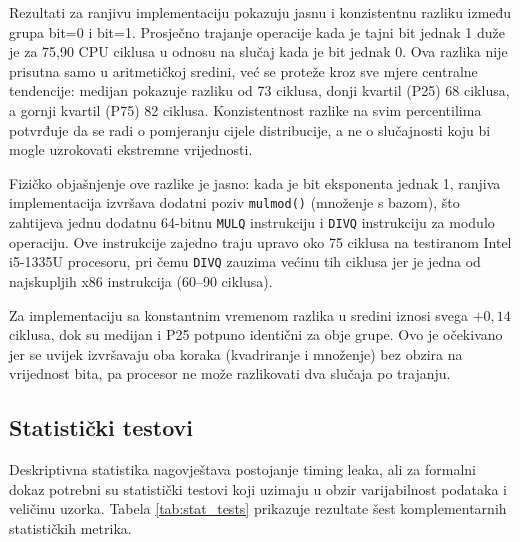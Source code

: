 Rezultati za ranjivu implementaciju pokazuju jasnu i konzistentnu razliku između grupa bit=0 i bit=1. Prosječno trajanje operacije kada je tajni bit jednak 1 duže je za 75{,}90 CPU ciklusa u odnosu na slučaj kada je bit jednak 0. Ova razlika nije prisutna samo u aritmetičkoj sredini, već se proteže kroz sve mjere centralne tendencije: medijan pokazuje razliku od 73 ciklusa, donji kvartil (P25) 68 ciklusa, a gornji kvartil (P75) 82 ciklusa. Konzistentnost razlike na svim percentilima potvrđuje da se radi o pomjeranju cijele distribucije, a ne o slučajnosti koju bi mogle uzrokovati ekstremne vrijednosti.

Fizičko objašnjenje ove razlike je jasno: kada je bit eksponenta jednak 1, ranjiva implementacija izvršava dodatni poziv \texttt{mulmod()} (množenje s bazom), što zahtijeva jednu dodatnu 64-bitnu \texttt{MULQ} instrukciju i \texttt{DIVQ} instrukciju za modulo operaciju. Ove instrukcije zajedno traju upravo oko 75 ciklusa na testiranom Intel i5-1335U procesoru, pri čemu \texttt{DIVQ} zauzima većinu tih ciklusa jer je jedna od najskupljih x86 instrukcija (60--90 ciklusa).

Za implementaciju sa konstantnim vremenom razlika u sredini iznosi svega $+0{,}14$ ciklusa, dok su medijan i P25 potpuno identični za obje grupe. Ovo je očekivano jer se uvijek izvršavaju oba koraka (kvadriranje i množenje) bez obzira na vrijednost bita, pa procesor ne može razlikovati dva slučaja po trajanju.

\subsection{Statistički testovi}
\label{sec:stat_tests}

Deskriptivna statistika nagovještava postojanje timing leaka, ali za formalni dokaz potrebni su statistički testovi koji uzimaju u obzir varijabilnost podataka i veličinu uzorka. Tabela \ref{tab:stat_tests} prikazuje rezultate šest komplementarnih statističkih metrika.

